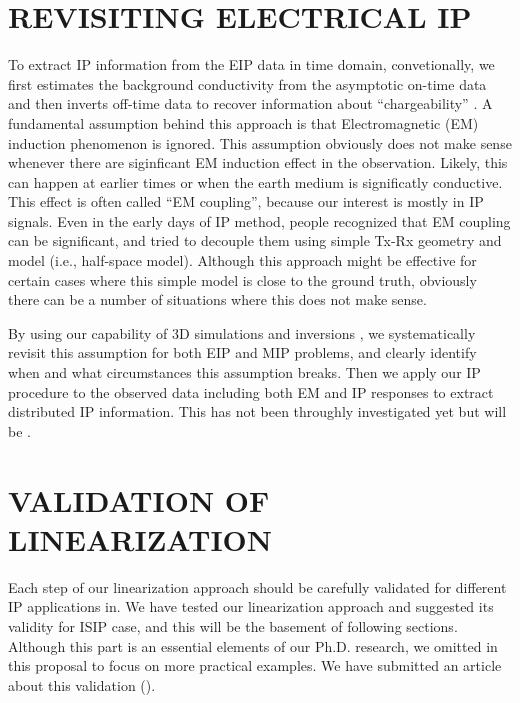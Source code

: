 \documentclass[letterpaper,11pt]{article}
\begin{document}
\section{REVISITING ELECTRICAL IP}
To extract IP information from the EIP data in time domain, convetionally, we first estimates the background conductivity from the asymptotic on-time data and then inverts off-time data to recover information about ``chargeability'' \cite[]{doug1994}. 
A fundamental assumption behind this approach is that Electromagnetic (EM) induction phenomenon is ignored. 
This assumption obviously does not make sense whenever there are siginficant EM induction effect in the observation. Likely, this can happen at earlier times or when the earth medium is significatly conductive. 
This effect is often called “EM coupling”, because our interest is mostly in IP signals. Even in the early days of IP method, people recognized that EM coupling can be significant, and tried to decouple them using simple Tx-Rx geometry and model (i.e., half-space model). Although this approach might be effective for certain cases where this simple model is close to the ground truth, obviously there can be a number of situations where this does not make sense. 

By using our capability of 3D simulations and inversions \cite[]{Marchant2014,Li2000,Chen2003}, we systematically revisit this assumption for both EIP and MIP problems, and clearly identify when and what circumstances this assumption breaks. Then we apply our IP procedure to the observed data including both EM and IP responses to extract distributed IP information. This has not been throughly investigated yet but will be . 

\section{VALIDATION OF LINEARIZATION}
Each step of our linearization approach should be carefully validated for different IP applications in. We have tested our linearization approach and suggested its validity for ISIP case, and this will be the basement of following sections. Although this part is an essential elements of our Ph.D. research, we omitted in this proposal to focus on more practical examples. We have submitted an article about this validation (\cite{Kang2015c}).
\end{document}
